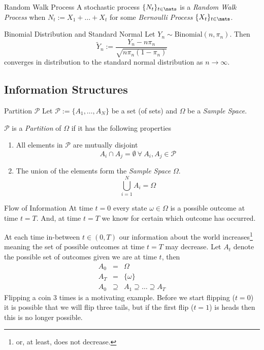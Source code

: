 \documentclass[11pt,a4paper]{article}
\begin{document}
  \begin{definition}{Random Walk Process}
    A stochastic process $\{N_t\}_{t\in\nats}$ is a \textit{Random Walk Process} when $N_t:=X_1+\dots+X_t$ for some \textit{Bernoulli Process} $\{X_t\}_{t\in\nats}$.
  \end{definition}

  \begin{theorem}{Binomial Distribution and Standard Normal}\label{the_binomial_distribution_and_standard_normal}
    Let $Y_n\sim\text{Binomial}(n,\pi_n)$. Then
    \[ \tilde{Y}_n:=\frac{Y_n-n\pi_n}{\sqrt{n\pi_n(1-\pi_n)}} \]
    converges in distribution to the standard normal distribution as $n\to\infty$.
  \end{theorem}

\subsection{Information Structures}

  \begin{definition}{Partition $\mathcal{P}$}
    Let $\mathcal{P}:=\{A_1,\dots,A_N\}$ be a set (of sets) and $\Omega$ be a \textit{Sample Space}.
    \par $\mathcal{P}$ is a \textit{Partition} of $\Omega$ if it has the following properties
    \begin{enumerate}
      \item All elements in $\mathcal{P}$ are mutually disjoint
      \[ A_i\cap A_j=\emptyset\ \forall\ A_i,A_j\in\mathcal{P} \]
      \item The union of the elements form the \textit{Sample Space} $\Omega$.
      \[ \bigcup_{i=1}^NA_i=\Omega \]
    \end{enumerate}
  \end{definition}

  \begin{remark}{Flow of Information}
    At time $t=0$ every state $\omega\in\Omega$ is a possible outcome at time $t=T$. And, at time $t=T$ we know for certain which outcome has occurred.
    \par At each time in-between $t\in(0,T)$ our information about the world increases\footnote{or, at least, does not decrease.} meaning the set of possible outcomes at time $t=T$ may decrease. Let $A_t$ denote the possible set of outcomes given we are at time $t$, then
    \[\begin{array}{rcl}
      A_0&=&\Omega\\
      A_T&=&\{\omega\}\\
      A_0&\supseteq&A_1\supseteq\dots\supseteq A_T
    \end{array}\]
    Flipping a coin 3 times is a motivating example. Before we start flipping ($t=0$) it is possible that we will flip three tails, but if the first flip ($t=1$) is heads then this is no longer possible.
  \end{remark}
\end{document}
